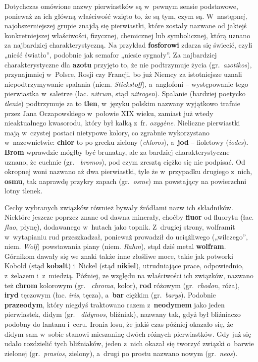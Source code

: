 \begin{dwieszpalty}

Dotychczas omówione nazwy pierwiastków są w~pewnym sensie podstawowe,
ponieważ za ich główną właściwość wzięto to, że są tym, czym są. W~następnej, najobszerniejszej grupie znajdą się pierwiastki, które
zostały nazwane od jakiejś konkretniejszej właściwości, fizycznej,
chemicznej lub symbolicznej, którą uznano za najbardziej
charakterystyczną. Na przykład \textbf{fosforowi} zdarza się świecić,
czyli „nieść światło'', podobnie jak semafor „niesie sygnały''. Za
najbardziej charakterystyczne dla \textbf{azotu} przyjęto to, że nie
podtrzymuje życia (gr.~\emph{azotikos}), przynajmniej w~Polsce, Rosji
czy Francji, bo już Niemcy za istotniejsze uznali niepodtrzymywanie
spalania (niem. \emph{Stickstoff}), a~anglofoni -- występowanie tego
pierwiastka w~saletrze (łac. \emph{nitrum}, stąd \emph{nitrogen}).
Spalanie (bardziej poetycko \emph{tlenie}) podtrzymuje za to
\textbf{tlen}, w~języku polskim nazwany wyjątkowo trafnie przez Jana
Oczapowskiego w~połowie XIX wieku, zamiast już wtedy nieaktualnego
kwasorodu, który był kalką z~fr. \emph{oxygène}. Nieliczne pierwiastki
mają w~czystej postaci nietypowe kolory, co zgrabnie wykorzystano w~nazewnictwie: \textbf{chlor} to po grecku zielony (\emph{chloros}), a~\textbf{jod} -- fioletowy (\emph{iodes}). \textbf{Brom} wprawdzie mógłby
być brunatny, ale za bardziej charakterystyczne uznano, że cuchnie (gr.~%
\emph{bromos}), pod czym zresztą ciężko się nie podpisać. Od okropnej
woni nazwano aż dwa pierwiastki, tyle że w~przypadku drugiego z~nich,
\textbf{osmu}, tak naprawdę przykry zapach (gr.~\emph{osme}) ma
powstający na powierzchni lotny tlenek.


Cechy wybranych związków również bywały źródłami nazw ich składników.
Niektóre jeszcze poprzez znane od dawna minerały, choćby \textbf{fluor}
od fluorytu (łac. \emph{fluo}, płynę), dodawanego w~hutach jako topnik.
Z~drugiej strony, wolframit w~wytapianiu rud przeszkadzał, ponieważ
prowadził do uciążliwego („wilczego'', niem. \emph{Wolf}) powstawania
piany (niem. \emph{Rahm}), stąd dziś metal \textbf{wolfram}. Górnikom
dawały się we znaki także inne złośliwe moce, takie jak potworki Kobold
(stąd \textbf{kobalt}) i~Nickel (stąd \textbf{nikiel}), utrudniające
prace, odpowiednio, z~żelazem i~z~miedzią. Później, ze względu na
właściwości ich związków, nazwano też \textbf{chrom} kolorowym (gr.~%
\emph{chroma}, kolor), \textbf{rod} różowym (gr.~\emph{rhodon}, róża),
\textbf{iryd} tęczowym (łac. \emph{iris}, tęcza), a~\textbf{bar} ciężkim
(gr.~\emph{barys}). Podobnie \textbf{prazeodym}, który niegdyś
traktowano razem z~\textbf{neodymem} jako jeden pierwiastek, didym (gr.~%
\emph{didymos}, bliźniak), nazwany tak, gdyż był bliźniaczo podobny do
lantanu i~ceru. Ironia losu, że jakiś czas później okazało się, że didym
sam w~sobie stanowi mieszaninę dwóch różnych pierwiastków. Gdy już się
udało rozdzielić tych bliźniaków, jeden z~nich okazał się tworzyć
związki o~barwie zielonej (gr.~\emph{prasios}, zielony), a~drugi po
prostu nazwano nowym (gr.~\emph{neos}).


\end{dwieszpalty}
